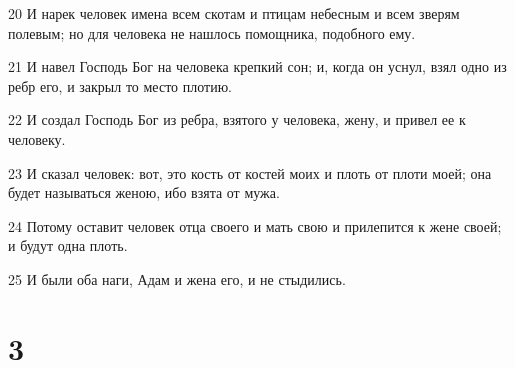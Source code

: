 \par 20 И нарек человек имена всем скотам и птицам небесным и всем зверям полевым; но для человека не нашлось помощника, подобного ему.
\par 21 И навел Господь Бог на человека крепкий сон; и, когда он уснул, взял одно из ребр его, и закрыл то место плотию.
\par 22 И создал Господь Бог из ребра, взятого у человека, жену, и привел ее к человеку.
\par 23 И сказал человек: вот, это кость от костей моих и плоть от плоти моей; она будет называться женою, ибо взята от мужа.
\par 24 Потому оставит человек отца своего и мать свою и прилепится к жене своей; и будут одна плоть.
\par 25 И были оба наги, Адам и жена его, и не стыдились.

\chapter{3}

